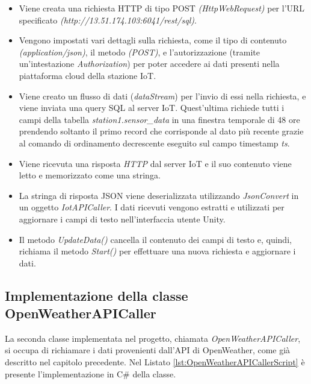 \begin{itemize}
	
	\item Viene creata una richiesta HTTP di tipo POST \textit{(HttpWebRequest)} per l'URL specificato \textit{(http://13.51.174.103:6041/rest/sql)}.
	\item Vengono impostati vari dettagli sulla richiesta, come il tipo di contenuto \textit{(application/json)}, il metodo \textit{(POST)}, e l'autorizzazione (tramite un'intestazione \textit{Authorization}) per poter accedere ai dati presenti nella piattaforma cloud della stazione IoT.
	\item Viene creato un flusso di dati (\textit{dataStream}) per l'invio di essi nella richiesta, e viene inviata una query SQL al server IoT. Quest'ultima richiede tutti i campi della tabella \textit{station1.sensor\_data} in una finestra temporale di 48 ore prendendo soltanto il primo record che corrisponde al dato più recente grazie al comando di ordinamento decrescente eseguito sul campo timestamp \textit{ts}.
	\item Viene ricevuta una risposta \textit{HTTP} dal server IoT e il suo contenuto viene letto e memorizzato come una stringa.
	\item La stringa di risposta JSON viene deserializzata utilizzando \textit{JsonConvert} in un oggetto \textit{IotAPICaller}. I dati ricevuti vengono estratti e utilizzati per aggiornare i campi di testo nell'interfaccia utente Unity.
	\item Il metodo \textit{UpdateData()} cancella il contenuto dei campi di testo e, quindi, richiama il metodo \textit{Start()} per effettuare una nuova richiesta e aggiornare i dati.
\end{itemize}

\subsection{Implementazione della classe OpenWeatherAPICaller}

La seconda classe implementata nel progetto, chiamata \textit{OpenWeatherAPICaller}, si occupa di richiamare i dati provenienti dall'API di OpenWeather, come già descritto nel capitolo precedente. Nel Listato \ref{lst:OpenWeatherAPICallerScript} è presente l'implementazione in C\# della classe.

